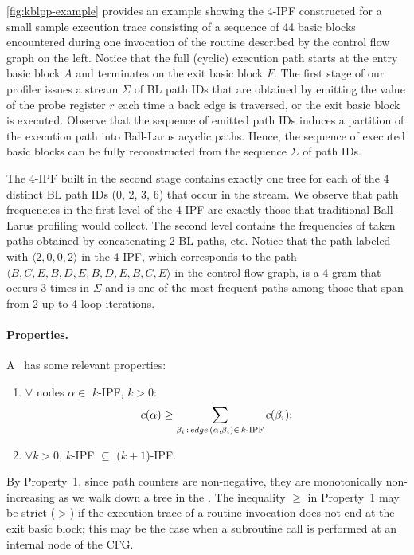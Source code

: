 \begin{example} \myfigure\ref{fig:kblpp-example} provides an example showing the 4-IPF constructed for a small sample execution trace consisting of a sequence of 44 basic blocks encountered during one invocation of the routine described by the control flow graph on the left. Notice that the full (cyclic) execution path starts at the entry basic block $A$ and terminates on the exit basic block $F$. The first stage of our profiler issues a stream $\Sigma$ of BL path IDs that are obtained by emitting the value of the probe register $r$ each time a back edge is traversed, or the exit basic block is executed. Observe that the sequence of emitted path IDs induces a partition of the execution path into Ball-Larus acyclic paths. Hence, the sequence of executed basic blocks can be fully reconstructed from the sequence $\Sigma$ of path IDs.

The 4-IPF built in the second stage contains exactly one tree for each of the 4 distinct BL path IDs (0, 2, 3, 6) that occur in the stream. We observe that path frequencies in the first level of the 4-IPF are exactly those that traditional Ball-Larus profiling would collect. The second level contains the frequencies of taken paths obtained by concatenating 2 BL paths, etc. Notice that the path labeled with $\langle 2, 0, 0, 2\rangle$ in the 4-IPF, which corresponds to the path $\langle B, C, E, B, D, E, B, D, E, B, C, E \rangle$ in the control flow graph, is a 4-gram that occurs 3 times in $\Sigma$ and is one of the most frequent paths among those that span from 2 up to 4 loop iterations.
\end{example}

\paragraph*{Properties.} 
A \kipf\ has some relevant properties:
\begin{enumerate}
\item $\forall$ nodes $\alpha\in$ $k$-IPF, $k>0$: $$c(\alpha)\ge\sum_{\beta_i\,:\,edge\,(\alpha,\beta_i)\in\,k\mbox{\scriptsize-IPF}} c(\beta_i);$$
\item $\forall k>0$, $k$-IPF $\subseteq$ ($k+1$)-IPF.
\end{enumerate}

\noindent By Property~1, since path counters are non-negative, they are monotonically non-increasing as we walk down a tree in the \kipf. The inequality $\ge$ in Property~1 may be strict ($>$) if the execution trace of a routine invocation does not end at the exit basic block; this may be the case when a subroutine call is performed at an internal node of the CFG. 

